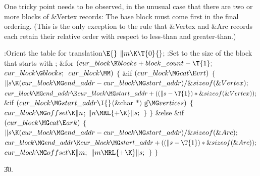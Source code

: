 One tricky point needs to be observed, in the unusual case that
there are two or more blocks of \&{Vertex} records: The base block
 must come first in the final ordering. (This is the
only
exception to the rule that \&{Vertex} and \&{Arc} records each retain
their relative order with respect to less-than and greater-than.)

\Y\B\4:Orient the  table for translation\X${}\E{}$\6
$\|m\K\T{0}{}$;\5
:Set  to the size of the block that starts with \X;\6
\&{for} ${}(\\{cur\_block}\K\\{blocks}+\\{block\_count}-\T{1};{}$ ${}\\{cur%
\_block}\G\\{blocks};{}$ ${}\\{cur\_block}\MM){}$\5
${}\{{}$\1\6
\&{if} ${}(\\{cur\_block}\MG\\{cat}\E\\{vrt}){}$\5
${}\{{}$\1\6
${}\|s\K(\\{cur\_block}\MG\\{end\_addr}-\\{cur\_block}\MG\\{start\_addr})/%
\&{sizeof}(\&{Vertex});{}$\6
${}\\{cur\_block}\MG\\{end\_addr}\K\\{cur\_block}\MG\\{start\_addr}+((\|s-%
\T{1})*\&{sizeof}(\&{Vertex}));{}$\6
\&{if} ${}(\\{cur\_block}\MG\\{start\_addr}\I{}$(\&{char} ${}{*}){}$ \|g${}\MG%
\\{vertices}){}$\5
${}\{{}$\1\6
${}\\{cur\_block}\MG\\{offset}\K\|n{}$;\5
${}\|n\MRL{+{\K}}\|s;{}$\6
\4${}\}{}$\2\6
\4${}\}{}$\5
\2\&{else} \&{if} ${}(\\{cur\_block}\MG\\{cat}\E\\{ark}){}$\5
${}\{{}$\1\6
${}\|s\K(\\{cur\_block}\MG\\{end\_addr}-\\{cur\_block}\MG\\{start\_addr})/%
\&{sizeof}(\&{Arc});{}$\6
${}\\{cur\_block}\MG\\{end\_addr}\K\\{cur\_block}\MG\\{start\_addr}+((\|s-%
\T{1})*\&{sizeof}(\&{Arc}));{}$\6
${}\\{cur\_block}\MG\\{offset}\K\|m;{}$\6
${}\|m\MRL{+{\K}}\|s;{}$\6
\4${}\}{}$\2\6
\4${}\}{}$\2\par
\U30.\fi


